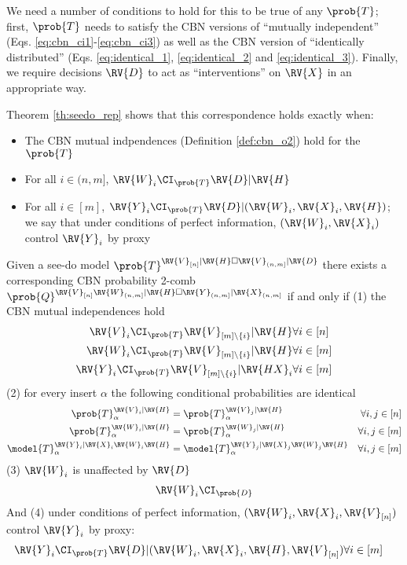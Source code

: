 We need a number of conditions to hold for this to be true of any $\prob{T}$; first, $\prob{T}$ needs to satisfy the CBN versions of ``mutually independent'' (Eqs. \ref{eq:cbn_ci1}-\ref{eq:cbn_ci3}) as well as the CBN version of ``identically distributed'' (Eqs. \ref{eq:identical_1}, \ref{eq:identical_2} and \ref{eq:identical_3}). Finally, we require decisions $\RV{D}$ to act as ``interventions'' on $\RV{X}$ in an appropriate way.

Theorem \ref{th:seedo_rep} shows that this correspondence holds exactly when:
\begin{itemize}
    \item The CBN mutual indpendences (Definition \ref{def:cbn_o2}) hold for the $\prob{T}$
    \item For all $i\in (n,m]$, $\RV{W}_i\CI_{\prob{T}}\RV{D}|\RV{H}$
    \item For all $i\in [m]$, $\RV{Y}_i\CI_{\prob{T}}\RV{D}|(\RV{W}_i,\RV{X}_i,\RV{H})$; we say that under conditions of perfect information, $(\RV{W}_i,\RV{X}_i)$ control $\RV{Y}_i$ by proxy
\end{itemize}

\begin{theorem}\label{th:seedo_rep}
Given a see-do model $\prob{T}^{\RV{V}_{[n]}|\RV{H}\square \RV{V}_{(n,m]}|\RV{D}}$ there exists a corresponding CBN probability 2-comb $\prob{Q}^{\RV{V}_{[n]}\RV{W}_{(n,m]}|\RV{H}\square \RV{Y}_{(n,m]}|\RV{X}_{(n,m]}}$ if and only if (1) the CBN mutual independences hold
\begin{align}
    \RV{V}_i\CI_{\prob{T}} \RV{V}_{[m]\setminus \{i\}}|\RV{H}&\forall i\in [n]\\
    \RV{W}_i\CI_{\prob{T}} \RV{V}_{[m]\setminus \{i\}}|\RV{H}&\forall i\in [m]\\
    \RV{Y}_i\CI_{\prob{T}} \RV{V}_{[m]\setminus \{i\}}|\RV{HX}_i&\forall i\in [m]\\
\end{align}
(2) for every insert $\alpha$ the following conditional probabilities are identical
\begin{align}
    \prob{T}_\alpha^{\RV{V}_i|\RV{H}} &= \prob{T}_\alpha^{\RV{V}_j|\RV{H}}&\forall i,j\in [n]\\
    \prob{T}_\alpha^{\RV{W}_i|\RV{H}} &= \prob{T}_\alpha^{\RV{W}_j|\RV{H}}&\forall i,j\in [m]\\
    \model{T}_\alpha^{\RV{Y}_i|\RV{X}_i\RV{W}_i\RV{H}} &= \model{T}_\alpha^{\RV{Y}_j|\RV{X}_j\RV{W}_j\RV{H}}&\forall i,j\in [m]
\end{align}
(3) $\RV{W}_i$ is unaffected by $\RV{D}$
\begin{align}
    \RV{W}_i\CI_{\prob{D}}
\end{align}
And (4) under conditions of perfect information, $(\RV{W}_i,\RV{X}_i,\RV{V}_{[n]})$ control $\RV{Y}_i$ by proxy:
\begin{align}
    \RV{Y}_i\CI_{\prob{T}}\RV{D}|(\RV{W}_i,\RV{X}_i,\RV{H},\RV{V}_{[n]})&\forall i\in [m]
\end{align}
\end{theorem}

